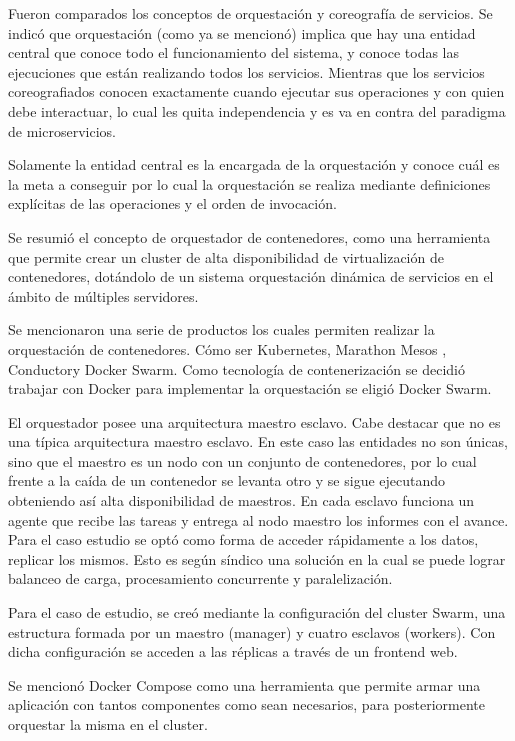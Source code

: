 Fueron comparados los conceptos de orquestación y coreografía de servicios. Se indicó que orquestación (como ya se mencionó) implica que hay una entidad central que conoce todo el funcionamiento del sistema, y conoce todas las ejecuciones que están realizando todos los servicios. Mientras que los servicios coreografiados conocen exactamente cuando ejecutar sus operaciones y con quien debe interactuar, lo cual les quita independencia y es va en contra del paradigma de microservicios.


Solamente la entidad central es la encargada de la orquestación y conoce cuál es la meta a conseguir por lo cual la orquestación se realiza mediante definiciones explícitas de las operaciones y el orden de invocación.


Se resumió el concepto de orquestador de contenedores, como una herramienta que permite crear un cluster de alta
disponibilidad de virtualización de contenedores, dotándolo de un sistema orquestación dinámica de servicios en el ámbito de múltiples servidores.

Se mencionaron una serie de productos los cuales permiten realizar la orquestación de contenedores.
Cómo ser Kubernetes, Marathon Mesos \cite{matathonMesos}, Conductor\cite{conductor}y Docker Swarm\cite{dockerSwarm}. 
Como tecnología de contenerización se decidió trabajar con Docker para implementar la orquestación se eligió  Docker Swarm. 
 
 
El orquestador posee una arquitectura maestro esclavo. Cabe destacar que no es una típica arquitectura maestro esclavo. En este caso las entidades no son únicas, sino que el maestro es un nodo con un conjunto de contenedores, por lo cual frente a la caída de un contenedor se levanta otro y se sigue ejecutando obteniendo así alta disponibilidad de maestros.
En cada esclavo funciona un agente que recibe las tareas y entrega al nodo maestro los informes con el avance. 
Para el caso estudio se optó como forma de acceder rápidamente a los datos, replicar los mismos. 
Esto es según síndico una solución en la cual se puede lograr balanceo de carga, procesamiento concurrente y paralelización. 


Para el caso de estudio, se creó mediante la configuración del cluster Swarm, una estructura formada por un maestro (manager) y cuatro esclavos (workers). 
Con dicha configuración se acceden a las réplicas a través de un frontend web.

Se mencionó Docker Compose\cite{dockerCompose} como una herramienta que permite armar una aplicación con tantos componentes como sean necesarios, para posteriormente orquestar la misma en el cluster. 


